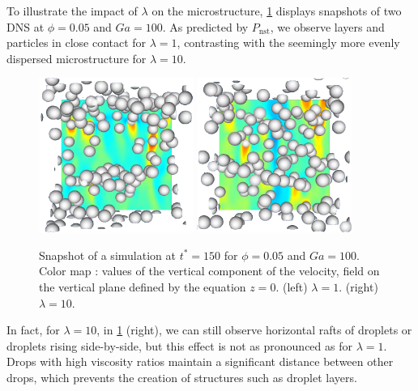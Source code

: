 \documentclass[11pt]{My_preprint}
\providecommand{\DIFaddbegin}{} %
\providecommand{\DIFaddbeginFL}{} %
\providecommand{\DIFaddendFL}{} %
\providecommand{\DIFdelbeginFL}{} %
\providecommand{\DIFdelendFL}{} %
\begin{document}
To illustrate the impact of $\lambda$ on the microstructure, \ref{fig:images} displays snapshots of two DNS at $\phi = 0.05$ and $Ga = 100$. 
As predicted by $P_\text{nst}$, we observe layers and particles in close contact for $\lambda = 1$, contrasting with the seemingly more evenly dispersed microstructure for $\lambda = 10$.
\begin{figure}[h!]
   \centering
   \DIFdelbeginFL %
\DIFdelendFL \DIFaddbeginFL \includegraphics[width=0.45\textwidth]{image/HOMOGENEOUS_NEW/P_PHI_5_l_10_Ga_100.png}
   \includegraphics[width=0.45\textwidth]{image/HOMOGENEOUS_NEW/P_PHI_5_l_1_Ga_100.png}
\DIFaddendFL \caption{Snapshot of a simulation at $t^* = 150$ for $\phi=0.05$ and $Ga=100$.
   Color map : values of the vertical component of the velocity, field on the vertical plane defined by the equation $z=0$. 
   (left)  $\lambda = 1$.
   (right)  $\lambda = 10$.
   }
   \label{fig:images}
\end{figure}
In fact, for $\lambda = 10$, in \ref{fig:images} (right), we can still observe horizontal rafts of droplets or droplets rising side-by-side, but this effect is not as pronounced as for $\lambda = 1$. 
Drops with high viscosity ratios maintain a significant distance between other drops, which prevents the creation of structures such as droplet layers.
\DIFaddbegin 
\end{document}
